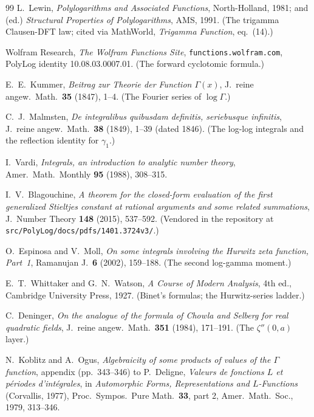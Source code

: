 \begin{thebibliography}{99}
L.~Lewin, \emph{Polylogarithms and Associated Functions}, North-Holland, 1981; and (ed.)
\emph{Structural Properties of Polylogarithms}, AMS, 1991. (The trigamma Clausen-DFT law;
cited via MathWorld, \emph{Trigamma Function}, eq.~(14).)

Wolfram Research, \emph{The Wolfram Functions Site}, \texttt{functions.wolfram.com},
PolyLog identity 10.08.03.0007.01. (The forward cyclotomic formula.)

E.~E.~Kummer, \emph{Beitrag zur Theorie der Function
$\Gamma(x)$}, J.~reine angew.\ Math.\ \textbf{35} (1847), 1--4. (The Fourier series of
$\log\Gamma$.)

C.~J.~Malmsten, \emph{De integralibus quibusdam definitis, seriebusque infinitis},
J.~reine angew.\ Math.\ \textbf{38} (1849), 1--39 (dated 1846). (The log-log integrals and
the reflection identity for $\gamma_1$.)

I.~Vardi, \emph{Integrals, an introduction to analytic number theory}, Amer.\ Math.\
Monthly \textbf{95} (1988), 308--315.

I.~V.~Blagouchine, \emph{A theorem for the closed-form evaluation of the first generalized
Stieltjes constant at rational arguments and some related summations}, J.~Number Theory
\textbf{148} (2015), 537--592. (Vendored in the repository at
\texttt{src/PolyLog/docs/pdfs/1401.3724v3/}.)

O.~Espinosa and V.~Moll, \emph{On some integrals involving the Hurwitz zeta function,
Part~1}, Ramanujan J.\ \textbf{6} (2002), 159--188. (The second log-gamma moment.)

E.~T.~Whittaker and G.~N.~Watson, \emph{A Course of Modern Analysis}, 4th ed., Cambridge
University Press, 1927. (Binet's formulas; the Hurwitz-series ladder.)

C.~Deninger, \emph{On the analogue of the formula of Chowla and Selberg for real quadratic
fields}, J.~reine angew.\ Math.\ \textbf{351} (1984), 171--191. (The $\zeta''(0,a)$
layer.)

N.~Koblitz and A.~Ogus, \emph{Algebraicity of some products of values of the $\Gamma$
function}, appendix (pp.~343--346) to P.~Deligne, \emph{Valeurs de fonctions $L$ et
p\'eriodes d'int\'egrales}, in \emph{Automorphic Forms, Representations and
$L$-Functions} (Corvallis, 1977), Proc.\ Sympos.\ Pure Math.\ \textbf{33}, part 2,
Amer.\ Math.\ Soc., 1979, 313--346.


\end{thebibliography}
